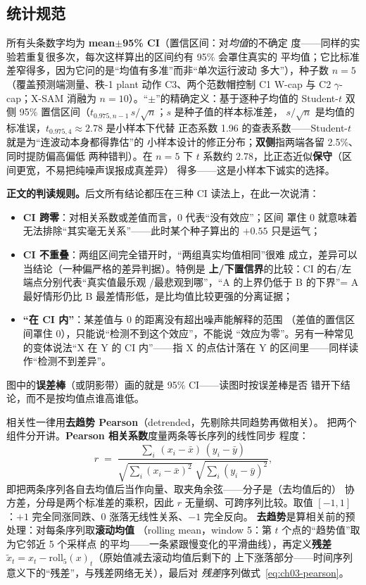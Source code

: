 \subsection{统计规范}
\label{sec:ch03-stats}

所有头条数字均为 \textbf{mean$\pm$95\% CI}（置信区间：对\emph{均值}的不确定
度——同样的实验若重复很多次，每次这样算出的区间约有 95\% 会罩住真实的
平均值；它比标准差窄得多，因为它问的是“均值有多准”而非“单次运行波动
多大”），种子数 $n{=}5$（覆盖预测端测量、秩-1
plant 动作 C3、两个范数帽控制 C1 W-cap 与 C2 $\gamma$-cap；X-SAM 消融为
$n{=}10$）。“$\pm$”的精确定义：基于逐种子均值的 Student-$t$ 双侧 95\%
置信区间（$t_{0.975,n-1}\,s/\sqrt{n}$；$s$ 是种子值的样本标准差，
$s/\sqrt{n}$ 是均值的标准误，$t_{0.975,4}\approx2.78$ 是小样本下代替
正态系数 1.96 的查表系数——Student-$t$ 就是为“连波动本身都得靠估”的
小样本设计的修正分布；\textbf{双侧}指两端各留 2.5\%、同时提防偏高偏低
两种错判）。在 $n{=}5$ 下 $t$ 系数约
$2.78$，比正态近似\textbf{保守}（区间更宽，不易把纯噪声误报成真差异）
得多——这是小样本下诚实的选择。

\textbf{正文的判读规则。}后文所有结论都压在三种 CI 读法上，在此一次说清：
\begin{itemize}
  \item \textbf{CI 跨零}：对相关系数或差值而言，0 代表“没有效应”；区间
        罩住 0 就意味着无法排除“其实毫无关系”——此时某个种子算出的
        $+0.55$ 只是运气；
  \item \textbf{CI 不重叠}：两组区间完全错开时，“两组真实均值相同”很难
        成立，差异可以当结论（一种偏严格的差异判据）。特例是
        \textbf{上/下置信界}的比较：CI 的右/左端点分别代表“真实值最乐观
        /最悲观到哪”，“A 的上界仍低于 B 的下界”= A 最好情形仍比 B
        最差情形低，是比均值比较更强的分离证据；
  \item \textbf{“在 CI 内”}：某差值与 0 的距离没有超出噪声能解释的范围
        （差值的置信区间罩住 0），只能说“检测不到这个效应”，不能说
        “效应为零”。另有一种常见的变体说法“X 在 Y 的 CI 内”——指
        X 的点估计落在 Y 的区间里——同样读作“检测不到差异”。
\end{itemize}
图中的\textbf{误差棒}（或阴影带）画的就是 95\% CI——读图时按误差棒是否
错开下结论，而不是按均值点谁高谁低。

相关性一律用\textbf{去趋势 Pearson}（detrended，先剔除共同趋势再做相关）。
把两个组件分开讲。\textbf{Pearson 相关系数}度量两条等长序列的线性同步
程度：
\begin{equation}
  r \;=\; \frac{\sum_{i}\,(x_i-\bar{x})\,(y_i-\bar{y})}
  {\sqrt{\textstyle\sum_{i}(x_i-\bar{x})^{2}}\;
   \sqrt{\textstyle\sum_{i}(y_i-\bar{y})^{2}}},
  \label{eq:ch03-pearson}
\end{equation}
即把两条序列各自去均值后当作向量、取夹角余弦——分子是（去均值后的）
协方差，分母是两个标准差的乘积，因此 $r$ 无量纲、可跨序列比较。取值
$[-1,1]$：$+1$ 完全同涨同跌、$0$ 涨落无线性关系、$-1$ 完全反向。
\textbf{去趋势}是算相关前的预处理：对每条序列取\textbf{滚动均值}
（rolling mean，window 5：第 $t$ 个点的“趋势值”取为它邻近 5 个采样点
的平均——一条紧跟慢变化的平滑曲线），再定义\textbf{残差}
$\tilde{x}_t=x_t-\mathrm{roll}_{5}(x)_t$（原始值减去滚动均值后剩下的
上下涨落部分——时间序列意义下的“残差”，与残差网络无关），最后对
\emph{残差}序列做式~\eqref{eq:ch03-pearson}。

